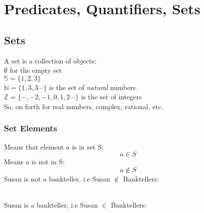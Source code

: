 \section{Predicates, Quantifiers, Sets}
\subsection{Sets}

A \gls{set} is a collection of objects: \\
\newline $ \emptyset $ for the empty set \\
$ \mathbb{S} = \{1, 2, 3\}$ \\ 
$ \mathbb{N} = \{ 1,3,3\cdots\}$  is the set of \textit{natural} numbers. \\
$ \mathbb{Z} = \{\cdots, -2, -1, 0, 1, 2 \cdots\} $ is the set of integers \\
\newline So, on forth  for real numbers, complex, rational, etc.

\subsubsection{Set Elements}

Means that element $a$ is in set S: 
\begin{equation}
 a \in S 
\end{equation}
Means $a$ is not in S:
\begin{equation}
 a \notin S
\end{equation}
\newline Susan is not a bankteller, i.e  Susan $\notin$ Banktellers: \newline
\newline {} \\
\newline Susan is a bankteller, i.e Susan $\in$ Banktellers: \newline
\newline {} \\


